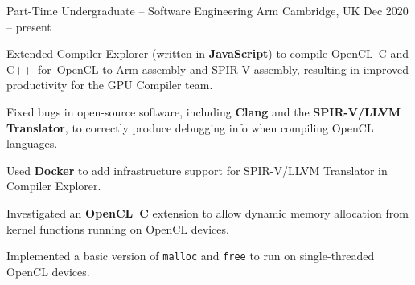 

\begin{cventries}



\cventry
{Part-Time Undergraduate -- Software Engineering} %
{Arm} %
{Cambridge, UK} %
{Dec 2020 -- present} %
{
  \begin{cvitems} %
    \item Extended Compiler Explorer (written in \textbf{JavaScript}) to compile OpenCL~C and C++~for~OpenCL to Arm assembly and SPIR-V assembly, resulting in improved productivity for the GPU Compiler team.
    \item Fixed bugs in open-source software, including \textbf{Clang} and the \textbf{SPIR-V/LLVM Translator}, to correctly produce debugging info when compiling OpenCL languages.
    \item Used \textbf{Docker} to add infrastructure support for SPIR-V/LLVM Translator in Compiler Explorer.
    \item Investigated an \textbf{OpenCL~C} extension to allow dynamic memory allocation from kernel functions running on OpenCL devices.
    \item Implemented a basic version of \lstinline$malloc$ and \lstinline$free$ to run on single-threaded OpenCL devices.
  \end{cvitems}
}


\end{cventries}
